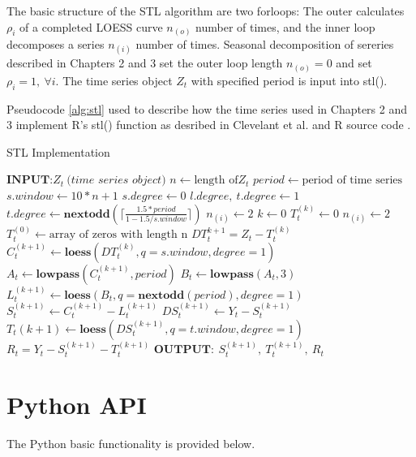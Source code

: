 The basic structure of the STL algorithm are two forloops: The outer calculates $\rho_i$ of a completed LOESS curve $n_{(o)}$ number of times, and the inner loop decomposes a series $n_{(i)}$ number of times. Seasonal decomposition of sereries described in Chapters 2 and 3 set the outer loop length $n_{(o)} = 0$ and set $\rho_i = 1,\ \forall i$. The time series object $Z_t$ with specified period is input into stl().

Pseudocode \ref{alg:stl} used to describe how the time series used in Chapters 2 and 3 implement R's stl() function as desribed in Clevelant et al. \cite{cleveland1990stl} and R source code \cite{gupta}.

\begin{algorithm}
\caption{STL Implementation}\label{alg:stl}
\begin{algorithmic}[1]
\State $\textbf{INPUT:}Z_t\ \textit{(time series object)}$
\State $n \gets \text{length of} Z_t$
\State $period \gets \text{period of time series}$
\State $s.window \gets 10 * n + 1$
\State $s.degree \gets 0$
\State $l.degree,\ t.degree \gets 1$
\State $t.degree \gets \textbf{nextodd} \left(\lceil \frac{1.5 * period}{1 -1.5/s.window} \rceil \right)$
\State $n_{(i)} \gets 2$
\State $k \gets 0$
\State $T_t^{(k)} \gets 0$
\State $n_{(i)} \gets 2$
\State $T_t^{(0)} \gets \text{array of zeros with length n}$
\State $DT_t^{k+1} = Z_t - T_t^{(k)}$
\State $C_t^{(k+1)} \gets \textbf{loess}(DT_t^{(k)}, q=s.window, degree = 1)$
\State $A_t \gets \textbf{lowpass}(C_t^{(k+1)}, period)$
\State $B_t \gets \textbf{lowpass}(A_t, 3)$
\State $L_t^{(k+1)} \gets \textbf{loess}(B_t, q=\textbf{nextodd}(period), degree = 1)$
\State $S_t^{(k+1)} \gets C_t^{(k+1)} - L_t^{(k+1)}$
\State $DS_t^{(k+1)} \gets Y_t-S_t^{(k+1)}$
\State $T_t{(k+1)} \gets \textbf{loess}(DS_t^{(k+1)}, q=t.window, degree = 1)$
\EndFor
\State $R_t = Y_t - S_t^{(k+1)} - T_t^{(k+1)}$
\State $\textbf{OUTPUT}:\ S_t^{(k+1)},\ T_t^{(k+1)},\ R_t$
\EndProcedure
\end{algorithmic}
\end{algorithm}

\chapter{Python API}\label{append:python_api}

The Python basic functionality is provided below. 

